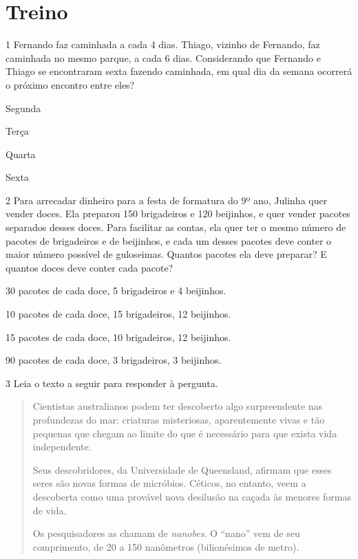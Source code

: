 \pagebreak
\section*{Treino}

\num{1} Fernando faz caminhada a cada 4 dias. Thiago, vizinho de
Fernando, faz caminhada no mesmo parque, a cada 6 dias. Considerando que
Fernando e Thiago se encontraram sexta fazendo caminhada, em qual dia da
semana ocorrerá o próximo encontro entre eles?

\begin{multicols}{2}
\begin{escolha}
\item Segunda
\item Terça
\item Quarta
\item Sexta
\end{escolha}
\end{multicols}

\num{2} Para arrecadar dinheiro para a festa de formatura do 9º ano,
Julinha quer vender doces. Ela preparou 150 brigadeiros e 120 beijinhos,
e quer vender pacotes separados desses doces. Para facilitar as contas,
ela quer ter o mesmo número de pacotes de brigadeiros e de beijinhos, e
cada um desses pacotes deve conter o maior número possível de guloseimas. 
Quantos pacotes ela deve preparar? E quantos doces deve conter cada 
pacote?   

\begin{escolha}
\item
  30 pacotes de cada doce, 5 brigadeiros e 4 beijinhos.
\item
  10 pacotes de cada doce, 15 brigadeiros, 12 beijinhos.
\item
  15 pacotes de cada doce, 10 brigadeiros, 12 beijinhos.
\item
  90 pacotes de cada doce, 3 brigadeiros, 3 beijinhos.
\end{escolha}

\num{3} Leia o texto a seguir para responder à pergunta.

\begin{quote}
Cientistas australianos podem ter descoberto algo surpreendente nas
profundezas do mar: criaturas misteriosas, aparentemente vivas e tão
pequenas que chegam ao limite do que é necessário para que exista vida
independente.

Seus descobridores, da Universidade de Queensland, afirmam que esses
seres são novas formas de micróbios. Céticos, no entanto, veem a
descoberta como uma provável nova desilusão na caçada às menores formas
de vida.

Os pesquisadores as chamam de \textit{nanobes}. O ``nano'' vem de seu 
comprimento, de 20 a 150 nanômetros (bilionésimos de metro).

\end{quote}

